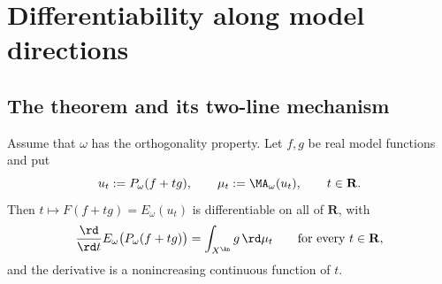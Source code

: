 \section{Differentiability along model directions}
\label{sec:ch27-model-directions}

\subsection{The theorem and its two-line mechanism}
\label{sec:ch27-model-mechanism}

\begin{theorem}
\label{thm:ch27-model-direction-differentiability}
Assume that $\omega$ has the orthogonality property.  Let $f,g$ be real
model functions and put
\[
 u_t:=P_\omega(f+tg),
 \qquad \mu_t:=\MA_\omega(u_t),
 \qquad t\in\mathbf R .
\]
Then $t\mapsto F(f+tg)=E_\omega(u_t)$ is differentiable on all of
$\mathbf R$, with
\begin{equation}\label{eq:ch27-model-direction-derivative}
 \frac{\rd}{\rd t}E_\omega\bigl(P_\omega(f+tg)\bigr)
 =\int_{X^{\An}}g\,\rd\mu_t
 \qquad\text{for every }t\in\mathbf R,
\end{equation}
and the derivative is a nonincreasing continuous function of $t$.
\end{theorem}

